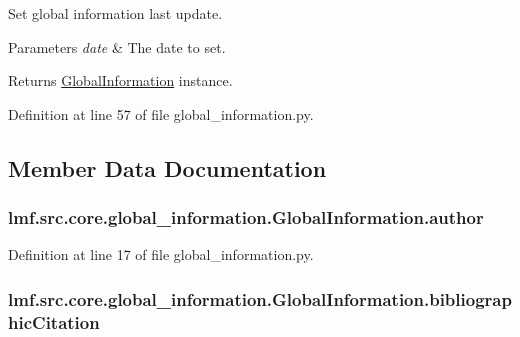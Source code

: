 Set global information last update. 


\begin{DoxyParams}{Parameters}
{\em date} & The date to set. \\
\hline
\end{DoxyParams}
\begin{DoxyReturn}{Returns}
\hyperlink{classlmf_1_1src_1_1core_1_1global__information_1_1_global_information}{Global\+Information} instance. 
\end{DoxyReturn}


Definition at line 57 of file global\+\_\+information.\+py.



\subsection{Member Data Documentation}
\hypertarget{classlmf_1_1src_1_1core_1_1global__information_1_1_global_information_a96ffe5559235b6b6c681b45a61d697af}{
\subsubsection[{author}]{\setlength{\rightskip}{0pt plus 5cm}lmf.\+src.\+core.\+global\+\_\+information.\+Global\+Information.\+author}}\label{classlmf_1_1src_1_1core_1_1global__information_1_1_global_information_a96ffe5559235b6b6c681b45a61d697af}


Definition at line 17 of file global\+\_\+information.\+py.

\hypertarget{classlmf_1_1src_1_1core_1_1global__information_1_1_global_information_a02d9de85d8225dc1411986b763df19ab}{
\subsubsection[{bibliographic\+Citation}]{\setlength{\rightskip}{0pt plus 5cm}lmf.\+src.\+core.\+global\+\_\+information.\+Global\+Information.\+bibliographic\+Citation}}\label{classlmf_1_1src_1_1core_1_1global__information_1_1_global_information_a02d9de85d8225dc1411986b763df19ab}


